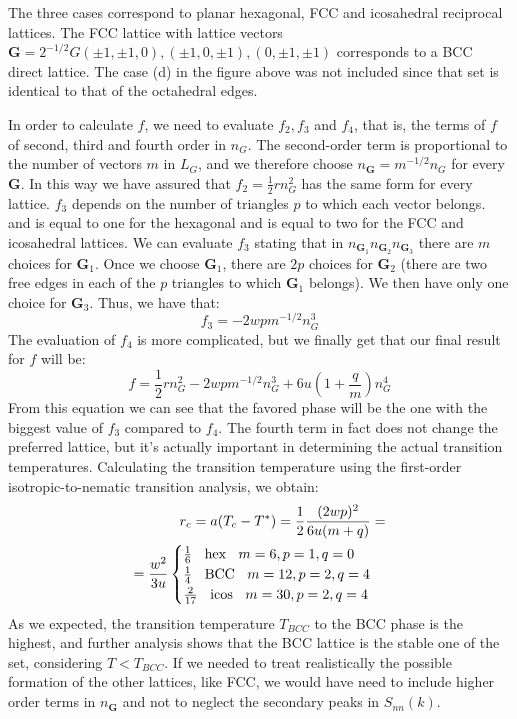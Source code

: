 \documentclass[12pt,a4paper]{article}
\begin{document}
The three cases correspond to planar hexagonal, FCC and icosahedral reciprocal lattices. The FCC lattice with lattice vectors $\textbf{G} = 2^{-1/2}G (\pm1,\pm1,0),(\pm1,0,\pm1),(0,\pm1,\pm1)$ corresponds to a BCC direct lattice. The case (d) in the figure above was not included since that set is identical to that of the octahedral edges.

In order to calculate $f$, we need to evaluate $f_2, f_3$ and $f_4$, that is, the terms of $f$ of second, third and fourth order in $n_G$. The second-order term is proportional to the number of vectors $m$ in $L_G$, and we therefore choose $n_\textbf{G} = m^{-1/2}n_G$ for every $\textbf{G}$. In this way we have assured that $f_2 = \frac{1}{2} r n^2_{G}$ has the same form for every lattice. $f_3$ depends on the number of triangles $p$ to which each vector belongs. and is equal to one for the hexagonal and is equal to two for the FCC and icosahedral lattices. We can evaluate $f_3$ stating that in $n_{\textbf{G}_1}n_{\textbf{G}_2}n_{\textbf{G}_3}$ there are $m$ choices for $\textbf{G}_1$. Once we choose $\textbf{G}_1$, there are $2p$ choices for $\textbf{G}_2$ (there are two free edges in each of the $p$ triangles to which $\textbf{G}_1$ belongs). We then have only one choice for $\textbf{G}_3$. Thus, we have that:
\begin{equation}
f_3=-2wpm^{-1/2}n^3_G
\end{equation}
The evaluation of $f_4$ is more complicated, but we finally get that our final result for $f$ will be:
\begin{equation}
f=\frac{1}{2}rn^2_G-2wpm^{-1/2}n^3_G+6u(1+\frac{q}{m})n^4_{G}
\end{equation}
From this equation we can see that the favored phase will be the one with the biggest value of $f_3$ compared to $f_4$. The fourth term in fact does not change the preferred lattice, but it's actually important in determining the actual transition temperatures. Calculating the transition temperature using the first-order isotropic-to-nematic transition analysis, we obtain:
\begin{equation}
\begin{split}
r_c=a(T_c-T^*)=\frac{1}{2}\frac{(2wp)^2}{6u(m+q)}=\\
=\frac{w^2}{3u}\begin{cases}\frac{1}{6}\text{\:\:\:\:hex\:\:\:\:} m=6, p=1, q=0 \\
\frac{1}{4}\text{\:\:\:\:BCC\:\:\:\:} m=12, p=2, q=4 \\
\frac{2}{17}\text{\:\:\:\:icos\:\:\:\:} m=30, p=2, q=4 
\end{cases}
\end{split}
\end{equation}
As we expected, the transition temperature $T_{BCC}$ to the BCC phase is the highest, and further analysis shows that the BCC lattice is the stable one of the set, considering $T<T_{BCC}$. If we needed to treat realistically the possible formation of the other lattices, like FCC, we would have need to include higher order terms in $n_{\textbf{G}}$ and not to neglect the secondary peaks in $S_{nn}(k)$.
\end{document}
